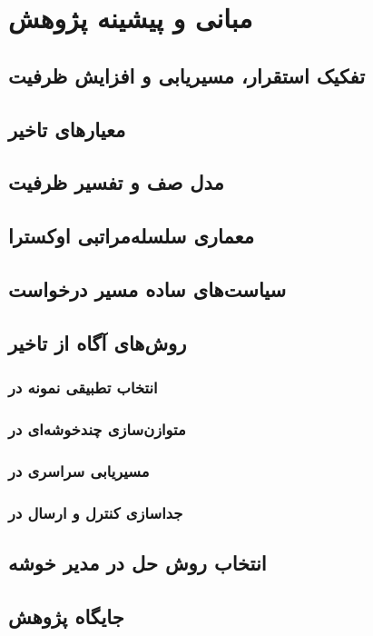 \chapter{مبانی و پیشینه پژوهش}

\label{chap:background}

\section{تفکیک استقرار، مسیریابی و افزایش ظرفیت}

\section{معیارهای تاخیر}

\section{مدل صف و تفسیر ظرفیت}

\section{معماری سلسله‌مراتبی اوکسترا}

\section{سیاست‌های ساده مسیر درخواست}

\section{روش‌های آگاه از تاخیر}

\subsection{انتخاب تطبیقی نمونه در }

\subsection{متوازن‌سازی چندخوشه‌ای در }

\subsection{مسیریابی سراسری در }

\subsection{جداسازی کنترل و ارسال در }

\section{انتخاب روش حل در مدیر خوشه}

\section{جایگاه پژوهش}
